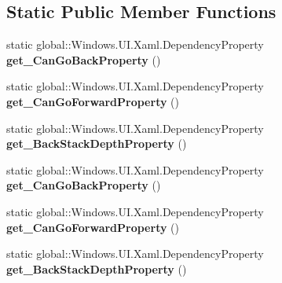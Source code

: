 \subsection*{Static Public Member Functions}
\begin{DoxyCompactItemize}
\item 
\mbox{\label{class_windows_1_1_u_i_1_1_xaml_1_1_controls_1_1_frame_a74bc4908ceb332506d52e29fe6abdd27}} 
static global\+::\+Windows.\+U\+I.\+Xaml.\+Dependency\+Property {\bfseries get\+\_\+\+Can\+Go\+Back\+Property} ()
\item 
\mbox{\label{class_windows_1_1_u_i_1_1_xaml_1_1_controls_1_1_frame_a3dda796c0ef8c9d00b6498a8eb185bed}} 
static global\+::\+Windows.\+U\+I.\+Xaml.\+Dependency\+Property {\bfseries get\+\_\+\+Can\+Go\+Forward\+Property} ()
\item 
\mbox{\label{class_windows_1_1_u_i_1_1_xaml_1_1_controls_1_1_frame_a4c33ec84310a13def5890e6cc1ed43ad}} 
static global\+::\+Windows.\+U\+I.\+Xaml.\+Dependency\+Property {\bfseries get\+\_\+\+Back\+Stack\+Depth\+Property} ()
\item 
\mbox{\label{class_windows_1_1_u_i_1_1_xaml_1_1_controls_1_1_frame_a74bc4908ceb332506d52e29fe6abdd27}} 
static global\+::\+Windows.\+U\+I.\+Xaml.\+Dependency\+Property {\bfseries get\+\_\+\+Can\+Go\+Back\+Property} ()
\item 
\mbox{\label{class_windows_1_1_u_i_1_1_xaml_1_1_controls_1_1_frame_a3dda796c0ef8c9d00b6498a8eb185bed}} 
static global\+::\+Windows.\+U\+I.\+Xaml.\+Dependency\+Property {\bfseries get\+\_\+\+Can\+Go\+Forward\+Property} ()
\item 
\mbox{\label{class_windows_1_1_u_i_1_1_xaml_1_1_controls_1_1_frame_a4c33ec84310a13def5890e6cc1ed43ad}} 
static global\+::\+Windows.\+U\+I.\+Xaml.\+Dependency\+Property {\bfseries get\+\_\+\+Back\+Stack\+Depth\+Property} ()
\item 
\mbox{\label{class_windows_1_1_u_i_1_1_xaml_1_1_controls_1_1_frame_a74bc4908ceb332506d52e29fe6abdd27}} 

\end{DoxyCompactItemize}
